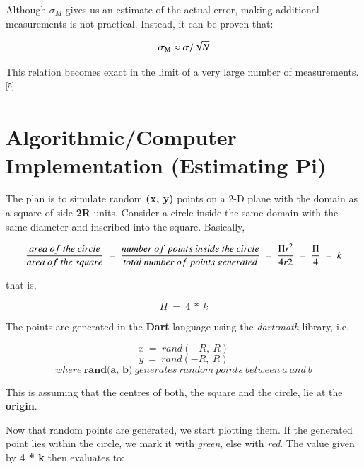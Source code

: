 \documentclass{resonance}
\begin{document}
	Although $\sigma_M$ gives us an estimate of the actual error, making additional measurements is not practical. Instead, it can be proven that:
	
	$$ \sigma\textsubscript{M} \approx \sigma/\sqrt{N} $$
	
	This relation becomes exact in the limit of a very large number of measurements.\textsuperscript{[5]}
	
	\section{Algorithmic/Computer Implementation (Estimating Pi)}
	
	The plan is to simulate random \textbf{(x, y)} points on a 2-D plane with the domain as a square of side \textbf{2R} units. Consider a circle inside the same domain with the same diameter and inscribed into the square. Basically,
	
	$$\frac{area\ of\ the\ circle}{area\ of\ the\ square}\ =\ \frac{number\ of\ points\ inside\ the\ circle}{total\ number\ of\ points\ generated}\ =\ \frac{\Pi r\textsuperscript{2}}{4r2}\ =\ \frac{\Pi}{4}\ =\ k$$
	
	that is,
	
	
	$$\Pi\ =\ 4\ *\ k$$
	
	The points are generated in the \textbf{Dart} language using the \textit{dart:math} library, i.e.
	
	$$x\ =\ rand(-R,\ R)$$
	$$y\ =\ rand(-R,\ R)$$
	$$where\ \textbf{rand(a,\ b)}\ generates\ random\ points\ between\ a\ and\ b$$
	
	This is assuming that the centres of both, the square and the circle, lie at the \textbf{origin}.
	
	Now that random points are generated, we start plotting them. If the generated point lies within the circle, we mark it with \textit{green}, else with \textit{red}. The value given by \textbf{4 * k} then evaluates to:
	
\end{document}
